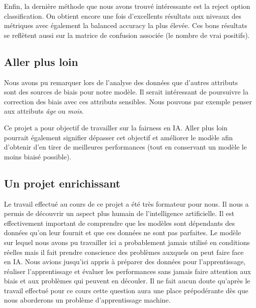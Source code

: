 \documentclass{article}
\begin{document}
    Enfin, la dernière méthode que nous avons trouvé intéressante est la reject option classification. On 
    obtient encore une fois d'excellents résultats aux niveaux des métriques avec également la balanced 
    accuracy la plus élevée. Ces bons résultats se reflètent aussi sur la matrice de confusion associée 
    (le nombre de vrai positifs).

    \subsection{Aller plus loin}
    Nous avons pu remarquer lors de l'analyse des données que d'autres attributs sont des sources de biais pour 
    notre modèle. Il serait intéressant de poursuivre la correction des biais avec ces attributs 
    sensibles. Nous pouvons par exemple penser aux attributs \textit{âge} ou \textit{mois}. 
    
    Ce projet a pour objectif de travailler sur la fairness en IA. Aller plus loin pourrait également 
    signifier dépasser cet objectif et améliorer le modèle afin d'obtenir d'en tirer de meilleures 
    performances (tout en conservant un modèle le moins biaisé possible).

    \subsection{Un projet enrichissant}
    Le travail effectué au cours de ce projet a été très formateur pour nous. Il nous a permis de 
    découvrir un aspect plus humain de l'intelligence artificielle. Il est effectivement important de 
    comprendre que les modèles sont dépendants des données qu'on leur fournit et que ces données ne 
    sont pas parfaites. Le modèle sur lequel nous avons pu travailler ici a probablement jamais utilisé
    en conditions réelles mais il fait prendre conscience des problèmes auxquels on peut faire face en IA.
    Nous avions jusqu'ici appris à préparer des données pour l'apprentissage, réaliser l'apprentissage et
    évaluer les performances sans jamais faire attention aux biais et aux problèmes qui peuvent en découler.
    Il ne fait aucun doute qu'après le travail effectué pour ce cours cette question aura une place 
    prépodérante dès que nous aborderons un problème d'apprentissage machine.


    \newpage
    \appendix 
\end{document}
